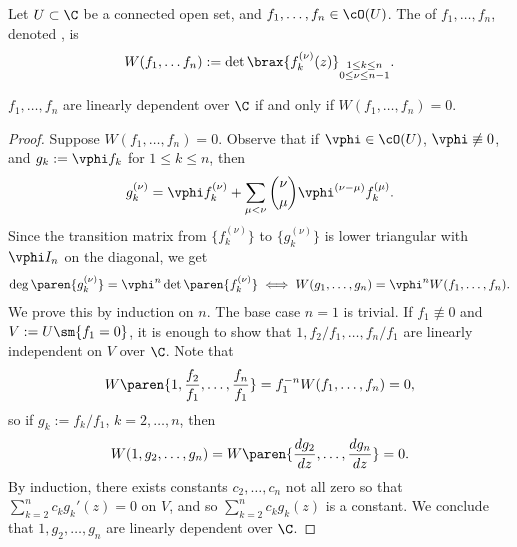 \documentclass[11pt]{report}
\begin{document}
\begin{defn}
Let $U \subset \C$ be a connected open set, and $f_1,\dots,f_n \in \cO(U)$. The  of $f_1,\dots,f_n$, denoted , is
\begin{align*}
W(f_1,\dots f_n) := \det \brax{f_k^{(\nu)}(z)}_{\substack{1 \leq k \leq n \\ 0 \leq \nu \leq n-1}}.
\end{align*}
\end{defn}

\begin{prop} \label{prop:wronskian-zero-dependent}
$f_1,\dots,f_n$ are linearly dependent over $\C$ if and only if $W(f_1,\dots,f_n)=0$.
\end{prop}

\begin{proof}
Suppose $W(f_1,\dots,f_n)=0$. Observe that if $\vphi \in \cO(U)$, $\vphi \not \equiv 0$, and $g_k :=\vphi f_k$ for $1 \leq k \leq n$, then
\begin{align*}
g_k^{(\nu)}= \vphi f_k^{(\nu)}+ \sum_{\mu < \nu}\binom{\nu}{\mu} \vphi^{(\nu-\mu)}f_k^{(\mu)}.
\end{align*}
Since the transition matrix from $\{f_k^{(\nu)}\}$ to $\{g_k^{(\nu)}\}$ is lower triangular with $\vphi I_n$ on the diagonal, we get
\begin{align*}
\deg \paren{g_k^{(\nu)}} = \vphi ^n \det \paren{f_k^{(\nu)}} \iff W(g_1,\dots,g_n) = \vphi^n W(f_1,\dots,f_n).
\end{align*}
We prove this by induction on $n$. The base case $n=1$ is trivial. If $f_1 \not \equiv 0$ and $V := U \sm \{f_1=0\}$, it is enough to show that $1,f_2/f_1,\dots,f_n/f_1$ are linearly independent on $V$ over $\C$. Note that
\begin{align*}
W\paren{1,\frac{f_2}{f_1},\dots,\frac{f_n}{f_1}} = f_1^{-n}W(f_1,\dots,f_n)=0,
\end{align*}
so if $g_k:= f_k/f_1$, $k=2,\dots,n$, then
\begin{align*}
W(1,g_2,\dots,g_n)=W\paren{ \frac{dg_2}{dz},\dots,\frac{dg_n}{dz}}=0.
\end{align*}
By induction, there exists constants $c_2,\dots,c_n$ not all zero so that
$\sum_{k=2}^nc_k g_k'(z)=0$
on $V$, and so $\sum_{k=2}^nc_kg_k(z)$ is a constant. We conclude that $1,g_2,\dots,g_n$ are linearly dependent over $\C$.
\end{proof}
\end{document}
